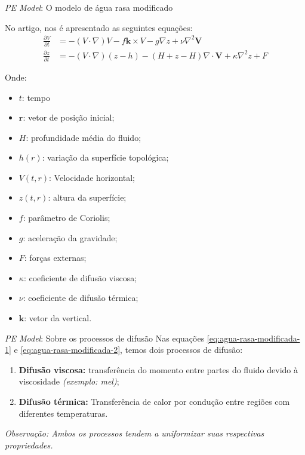 \begin{frame}{\textit{PE Model}: O modelo de água rasa modificado}
	\begin{small}
		No artigo, nos é apresentado as seguintes equações:
		\begin{align}
			\frac{\partial V}{\partial t} & = - ( V \cdot \nabla)V - f \mathbf{k} \times V - g \nabla z + \nu \nabla^2\mathbf{V} \label{eq:agua-rasa-modificada-1}     \\
			\frac{\partial z}{\partial t} & = - (V \cdot \nabla)(z - h) - (H + z - H)\nabla \cdot \mathbf{V} + \kappa \nabla^2 z + F \label{eq:agua-rasa-modificada-2} 
		\end{align}
	\end{small}
	\begin{scriptsize}
		Onde:
		\begin{multicols}{2}
			\begin{itemize}
				\item $t$: tempo
				\item $\mathbf{r}$: vetor de posição inicial;
				\item $H$: profundidade média do fluido;
				\item $h(r)$: variação da superfície topológica;
				\item $V(t,r)$: Velocidade horizontal;
				\item $z(t,r)$: altura da superfície;
				\item $f$: parâmetro de Coriolis;
				\item $g$: aceleração da gravidade;
				\item $F$: forças externas;
				\item $\kappa$: coeficiente de difusão viscosa;
				\item $\nu$: coeficiente de difusão térmica;
				\item $\mathbf{k}$: vetor da vertical.
			\end{itemize}
		\end{multicols}
	\end{scriptsize}
\end{frame}


\begin{frame}{\textit{PE Model}: Sobre os processos de difusão}
	Nas equações \eqref{eq:agua-rasa-modificada-1} e \eqref{eq:agua-rasa-modificada-2}, temos dois processos de difusão:
	\begin{enumerate}
		\item \textbf{Difusão viscosa:} transferência do momento entre partes do fluido devido à viscosidade \textit{(exemplo: mel)};
		\item \textbf{Difusão térmica:} Transferência de calor por condução entre regiões com diferentes temperaturas.
	\end{enumerate}
		
	\begin{small}
	    \textit{Observação: Ambos os processos tendem a uniformizar suas respectivas propriedades.}
	\end{small}
\end{frame}

